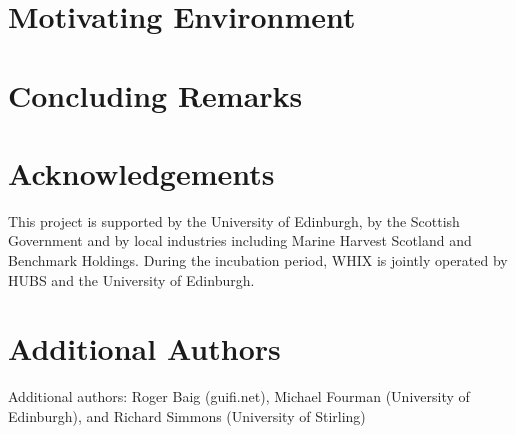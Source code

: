\documentclass{sig-alternate-10pt}
\begin{document}

\section{Motivating Environment}\label{subsec:hubs}

\section{Concluding Remarks} \label{sec:conc} 

\section{Acknowledgements}
This project is supported by the University of Edinburgh, by the
Scottish Government and by local industries including Marine Harvest
Scotland and Benchmark Holdings.  During the incubation period,
\ac{WHIX} is jointly operated by HUBS and the University of Edinburgh.

\section{Additional Authors}
Additional authors: Roger Baig (guifi.net), Michael Fourman (University of
Edinburgh), and Richard Simmons (University of Stirling)



\end{document}
